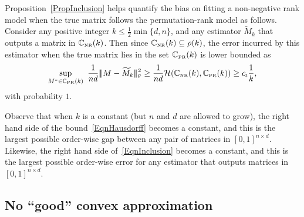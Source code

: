 \documentclass[11pt, hidelinks]{article} %
\newcommand{\matsnorm}[2]{|\!|\!| #1 | \! | \!|_{{#2}}}
\newcommand{\frobnorm}[1]{\ensuremath{\matsnorm{#1}{\mbox{\tiny{F}}}}}
\newcommand{\hausDis}{\mathcal{H}}
\newcommand{\numrows}{n}
\newcommand{\numcols}{d}
\newcommand{\plaincon}{c}
\newcommand{\UMODEL}{\ensuremath{\plaincon_{\mbox{\scalebox{.5}{3}}}}}
\newcommand{\wtmatrix}{M}
\newcommand{\wt}{\wtmatrix}
\newcommand{\wtstar}{\wtmatrix^*}
\newcommand{\wttil}{\widetilde{\wtmatrix}}
\newcommand{\matrixset}{\mathbb{C}}
\newcommand{\nnset}{\matrixset_{\mbox{\tiny NR}}}
\newcommand{\permset}{\matrixset_{\mbox{\tiny PR}}}
\newcommand{\permrank}{\rho}
\newcommand{\temprank}{k}
\begin{document}

Proposition~\ref{PropInclusion} helps
quantify the bias on fitting a non-negative rank model when the true
matrix follows the permutation-rank model as follows. Consider any
positive integer $\temprank \leq \frac{1}{2}\min\{\numcols, \numrows\}$, and
any estimator $\wttil_\temprank$ that outputs a matrix in $\nnset(\temprank)$. Then since $\nnset(\temprank) \subseteq \permrank(\temprank)$, the
error incurred by this estimator when the true matrix lies in the set
$\permset(k)$ is lower bounded as
\begin{align}
\label{EqnInclusion}
\sup_{\wtstar \in \permset(\temprank)} \ \frac{1}{ \numrows \numcols}
\frobnorm{\wt - \wttil_{\temprank}}^2 \geq  \frac{1}{\numrows \numcols} \hausDis( \nnset(k), \permset(k)) \geq \UMODEL \frac{1}{\temprank},
\end{align}
with probability $1$.

Observe that when $k$ is a constant (but $\numrows$ and $\numcols$ are
allowed to grow), the right hand side of the
bound~\eqref{EqnHausdorff} becomes a constant, and this is the largest possible order-wise gap between any pair of matrices in
$[0,1]^{\numrows \times \numcols}$. Likewise, the right hand side of~\eqref{EqnInclusion} becomes a constant, and this is the largest possible order-wise error for any estimator that outputs matrices in $[0,1]^{\numrows \times \numcols}$.


\subsection{No ``good'' convex approximation}
\end{document}
